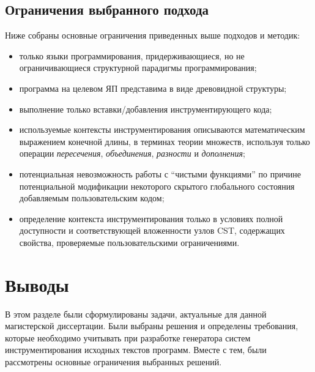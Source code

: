 \subsection{Ограничения выбранного подхода}

Ниже собраны основные ограничения приведенных выше подходов и методик:
\begin{itemize}[noitemsep]
  \item только языки программирования, придерживающиеся, но не ограничивающиеся структурной парадигмы программирования;
  \item программа на целевом ЯП представима в виде древовидной структуры;
  \item выполнение только вставки/добавления инструментирующего кода;
  \item используемые контексты инструментирования описываются математическим выражением конечной длины, в терминах теории множеств, используя только операции \textit{пересечения}, \textit{объединения}, \textit{разности} и \textit{дополнения};
  \item потенциальная невозможность работы с ``чистыми функциями'' по причине потенциальной модификации некоторого скрытого глобального состояния добавляемым пользовательским кодом;
  \item определение контекста инструментирования только в условиях полной доступности и соответствующей вложенности узлов CST, содержащих свойства, проверяемые пользовательскими ограничениями.
\end{itemize}

\section{Выводы}

В этом разделе были сформулированы задачи, актуальные для данной магистерской диссертации.
Были выбраны решения и определены требования, которые необходимо учитывать при разработке генератора систем инструментирования исходных текстов программ.
Вместе с тем, были рассмотрены основные ограничения выбранных решений.

